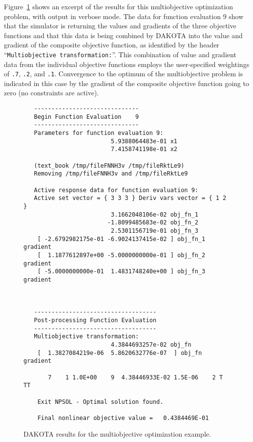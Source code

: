 Figure~\ref{opt:figure02} shows an excerpt of the results for this
multiobjective optimization problem, with output in verbose mode. The
data for function evaluation 9 show that the simulator is returning
the values and gradients of the three objective functions and that
this data is being combined by DAKOTA into the value and gradient of
the composite objective function, as identified by the header
``\texttt{Multiobjective transformation:}''. This combination of value
and gradient data from the individual objective functions employs the
user-specified weightings of \texttt{.7}, \texttt{.2}, and
\texttt{.1}. Convergence to the optimum of the multiobjective problem
is indicated in this case by the gradient of the composite objective
function going to zero (no constraints are active).

\begin{figure}
\centering
\begin{bigbox}
\begin{small}
\begin{verbatim}
   ------------------------------
   Begin Function Evaluation    9
   ------------------------------
   Parameters for function evaluation 9:
                         5.9388064483e-01 x1
                         7.4158741198e-01 x2

   (text_book /tmp/fileFNNH3v /tmp/fileRktLe9)
   Removing /tmp/fileFNNH3v and /tmp/fileRktLe9

   Active response data for function evaluation 9:
   Active set vector = { 3 3 3 } Deriv vars vector = { 1 2 }
                         3.1662048106e-02 obj_fn_1
                        -1.8099485683e-02 obj_fn_2
                         2.5301156719e-01 obj_fn_3
    [ -2.6792982175e-01 -6.9024137415e-02 ] obj_fn_1 gradient
    [  1.1877612897e+00 -5.0000000000e-01 ] obj_fn_2 gradient
    [ -5.0000000000e-01  1.4831748240e+00 ] obj_fn_3 gradient



   -----------------------------------
   Post-processing Function Evaluation
   -----------------------------------
   Multiobjective transformation:
                         4.3844693257e-02 obj_fn
    [  1.3827084219e-06  5.8620632776e-07  ] obj_fn gradient

       7    1 1.0E+00    9  4.38446933E-02 1.5E-06    2 T TT     

    Exit NPSOL - Optimal solution found.

    Final nonlinear objective value =   0.4384469E-01
\end{verbatim}
\end{small}
\end{bigbox}
\caption{DAKOTA results for the multiobjective optimization example.}
\label{opt:figure02}
\end{figure}

